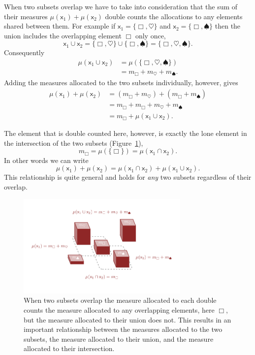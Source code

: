 \documentclass[
  letterpaper,
  DIV=11,
  numbers=noendperiod]{scrartcl}
\begin{document}
When two subsets overlap we have to take into consideration that the sum
of their measures \(\mu ( \mathsf{x}_{1} ) + \mu ( \mathsf{x}_{2} )\)
double counts the allocations to any elements shared between them. For
example if \(\mathsf{x}_{1} = \{ \Box, \heartsuit \}\) and
\(\mathsf{x}_{2} = \{ \Box, \spadesuit \}\) then the union includes the
overlapping element \(\Box\) only once, \[
\mathsf{x}_{1} \cup \mathsf{x}_{2}
=
\{ \Box, \heartsuit \} \cup \{ \Box, \spadesuit \}
=
\{ \Box, \heartsuit, \spadesuit \}.
\] Consequently \begin{align*}
\mu( \mathsf{x}_{1} \cup \mathsf{x}_{2} )
&=
\mu( \{ \Box, \heartsuit, \spadesuit \} )
\\
&=
m_{\Box} + m_{\heartsuit} + m_{\spadesuit}.
\end{align*} Adding the measures allocated to the two subsets
individually, however, gives \begin{align*}
\mu( \mathsf{x}_{1} ) + \mu ( \mathsf{x}_{2} )
&=
(m_{\Box} + m_{\heartsuit} ) + ( m_{\Box} + m_{\spadesuit} )
\\
&=
m_{\Box} + m_{\Box} + m_{\heartsuit} + m_{\spadesuit}
\\
&=
m_{\Box} + \mu( \mathsf{x}_{1} \cup \mathsf{x}_{2} ).
\end{align*}

The element that is double counted here, however, is exactly the lone
element in the intersection of the two subsets
(Figure~\ref{fig-overlapping_subsets_measures}), \[
m_{\Box} = \mu( \{ \Box \} ) = \mu( \mathsf{x}_{1} \cap \mathsf{x}_{2} ).
\] In other words we can write \[
\mu( \mathsf{x}_{1} ) + \mu ( \mathsf{x}_{2} )
=
  \mu( \mathsf{x}_{1} \cap \mathsf{x}_{2} )
+ \mu( \mathsf{x}_{1} \cup \mathsf{x}_{2} ).
\] This relationship is quite general and holds for \emph{any} two
subsets regardless of their overlap.

\begin{figure}

{\centering \includegraphics[width=0.75\textwidth,height=\textheight]{figures/overlapping_subsets_measures/overlapping_subsets_measures.pdf}

}

\caption{\label{fig-overlapping_subsets_measures}When two subsets
overlap the measure allocated to each double counts the measure
allocated to any overlapping elements, here \(\Box\), but the measure
allocated to their union does not. This results in an important
relationship between the measures allocated to the two subsets, the
measure allocated to their union, and the measure allocated to their
intersection.}

\end{figure}
\end{document}
